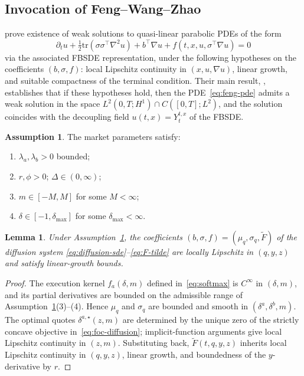 \documentclass[11pt,a4paper]{article}
\newtheorem{lemma}[theorem]{Lemma}
\theoremstyle{definition}
\newtheorem{assumption}[theorem]{Assumption}
\theoremstyle{remark}
\begin{document}
\subsection{Invocation of Feng--Wang--Zhao}

\citet{feng2018} prove existence of weak solutions to quasi-linear
parabolic PDEs of the form
\begin{equation}\label{eq:feng-pde}
\partial_t u + \tfrac{1}{2} \mathrm{tr}(\sigma \sigma^\top \nabla^2 u)
+ b^\top \nabla u + f(t, x, u, \sigma^\top \nabla u) = 0
\end{equation}
via the associated FBSDE representation, under the following
hypotheses on the coefficients $(b, \sigma, f)$: local
Lipschitz continuity in $(x, u, \nabla u)$, linear growth, and
suitable compactness of the terminal condition.  Their main
result, \citep[Theorem~3.3]{feng2018}, establishes that if these
hypotheses hold, then the PDE~\eqref{eq:feng-pde} admits a weak
solution in the space $L^2(0, T; H^1) \cap C([0, T]; L^2)$, and
the solution coincides with the decoupling field
$u(t, x) = Y_t^{t, x}$ of the FBSDE.

\begin{assumption}\label{asm:regularity}
The market parameters satisfy:
\begin{enumerate}
\item $\lambda_a, \lambda_b > 0$ bounded;
\item $r, \phi > 0$; $\Delta \in (0, \infty)$;
\item $m \in [-M, M]$ for some $M < \infty$;
\item $\delta \in [-1, \delta_{\max}]$ for some $\delta_{\max} < \infty$.
\end{enumerate}
\end{assumption}

\begin{lemma}\label{lem:coefficients-Lipschitz}
Under Assumption~\ref{asm:regularity}, the coefficients
$(b, \sigma, f) = (\mu_q, \sigma_q, \widetilde{F})$ of the
diffusion system \eqref{eq:diffusion-sde}--\eqref{eq:F-tilde} are
locally Lipschitz in $(q, y, z)$ and satisfy linear-growth
bounds.
\end{lemma}

\begin{proof}
The execution kernel $f_a(\delta, m)$ defined
in~\eqref{eq:softmax} is $C^\infty$ in $(\delta, m)$, and its
partial derivatives are bounded on the admissible range of
Assumption~\ref{asm:regularity}(3)--(4).  Hence $\mu_q$ and
$\sigma_q$ are bounded and smooth in $(\delta^a, \delta^b, m)$.
The optimal quotes $\delta^{a,\star}(z, m)$ are determined by the
unique zero of the strictly concave objective
in~\eqref{eq:foc-diffusion}; implicit-function arguments give
local Lipschitz continuity in $(z, m)$.  Substituting back,
$\widetilde{F}(t, q, y, z)$ inherits local Lipschitz continuity
in $(q, y, z)$, linear growth, and boundedness of the
$y$-derivative by $r$.
\end{proof}
\end{document}
